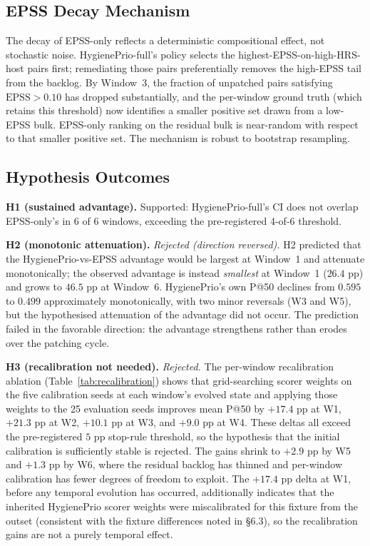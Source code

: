 \subsection{EPSS Decay Mechanism}

The decay of EPSS-only reflects a deterministic compositional effect, not stochastic noise. HygienePrio-full's policy selects the highest-EPSS-on-high-HRS-host pairs first; remediating those pairs preferentially removes the high-EPSS tail from the backlog. By Window~3, the fraction of unpatched pairs satisfying $\mathrm{EPSS} > 0.10$ has dropped substantially, and the per-window ground truth (which retains this threshold) now identifies a smaller positive set drawn from a low-EPSS bulk. EPSS-only ranking on the residual bulk is near-random with respect to that smaller positive set. The mechanism is robust to bootstrap resampling.

\subsection{Hypothesis Outcomes}

\textbf{H1 (sustained advantage).} Supported: HygienePrio-full's CI does not overlap EPSS-only's in 6 of 6 windows, exceeding the pre-registered 4-of-6 threshold.

\textbf{H2 (monotonic attenuation).} \textit{Rejected (direction reversed).} H2 predicted that the HygienePrio-vs-EPSS advantage would be largest at Window~1 and attenuate monotonically; the observed advantage is instead \textit{smallest} at Window~1 ($26.4$ pp) and grows to $46.5$ pp at Window~6. HygienePrio's own P@50 declines from $0.595$ to $0.499$ approximately monotonically, with two minor reversals (W3 and W5), but the hypothesised attenuation of the advantage did not occur. The prediction failed in the favorable direction: the advantage strengthens rather than erodes over the patching cycle.

\textbf{H3 (recalibration not needed).} \textit{Rejected.} The per-window recalibration ablation (Table~\ref{tab:recalibration}) shows that grid-searching scorer weights on the five calibration seeds at each window's evolved state and applying those weights to the 25 evaluation seeds improves mean P@50 by $+17.4$ pp at W1, $+21.3$ pp at W2, $+10.1$ pp at W3, and $+9.0$ pp at W4. These deltas all exceed the pre-registered $5$ pp stop-rule threshold, so the hypothesis that the initial calibration is sufficiently stable is rejected. The gains shrink to $+2.9$ pp by W5 and $+1.3$ pp by W6, where the residual backlog has thinned and per-window calibration has fewer degrees of freedom to exploit. The $+17.4$ pp delta at W1, before any temporal evolution has occurred, additionally indicates that the inherited HygienePrio scorer weights were miscalibrated for this fixture from the outset (consistent with the fixture differences noted in \S6.3), so the recalibration gains are not a purely temporal effect.

